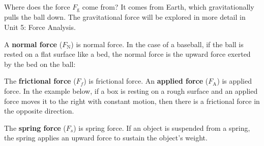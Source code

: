 \documentclass[dvipsnames]{article}
\begin{document}
Where does the force $F_\mathrm{g}$ come from? It comes from Earth, which gravitationally pulls the ball down. The gravitational force will be explored in more detail in Unit 5: Force Analysis.

A \textbf{\gls{normal force}} ($F_\text{N}$) is \glsdesc{normal force}. In the case of a baseball, if the ball is rested on a flat surface like a bed, the normal force is the upward force exerted by the bed on the ball:

\begin{center}
\end{center}


The \textbf{\gls{frictional force}} ($F_f$) is \glsdesc{frictional force}. An \textbf{\gls{applied force}} ($F_\mathrm{A}$) is \glsdesc{applied force}. In the example below, if a box is resting on a rough surface and an applied force moves it to the right with constant motion, then there is a frictional force in the opposite direction.

\begin{center}
\end{center}

The \textbf{\gls{spring force}} ($F_s$) is \glsdesc{spring force}. If an object is suspended from a spring, the spring applies an upward force to sustain the object's weight.

\begin{center}
\end{center}
\end{document}
